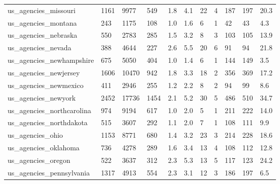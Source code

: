 \begin{longtable}{lllllllllll}
 us\_agencies\_missouri                               & 1161       & 9977      & 549   & 1.8    & 4.1    & 22    & 4      & 187    & 197    & 20.3    \\
 us\_agencies\_montana                                & 243        & 1175      & 108   & 1.0    & 1.6    & 6     & 1      & 42     & 43     & 4.3     \\
 us\_agencies\_nebraska                               & 550        & 2783      & 285   & 1.5    & 3.2    & 8     & 3      & 103    & 105    & 13.9    \\
 us\_agencies\_nevada                                 & 388        & 4644      & 227   & 2.6    & 5.5    & 20    & 6      & 91     & 94     & 21.8    \\
 us\_agencies\_newhampshire                           & 675        & 5050      & 404   & 1.0    & 1.4    & 6     & 1      & 144    & 149    & 3.5     \\
 us\_agencies\_newjersey                              & 1606       & 10470     & 942   & 1.8    & 3.3    & 18    & 2      & 356    & 369    & 17.2    \\
 us\_agencies\_newmexico                              & 411        & 2946      & 255   & 1.2    & 2.2    & 8     & 2      & 94     & 99     & 8.6     \\
 us\_agencies\_newyork                                & 2452       & 17736     & 1454  & 2.1    & 5.2    & 30    & 5      & 486    & 510    & 34.7    \\
 us\_agencies\_northcarolina                          & 974        & 9194      & 617   & 1.0    & 2.0    & 5     & 1      & 211    & 222    & 14.0    \\
 us\_agencies\_northdakota                            & 515        & 3607      & 292   & 1.1    & 2.0    & 7     & 1      & 108    & 111    & 9.9     \\
 us\_agencies\_ohio                                   & 1153       & 8771      & 680   & 1.4    & 3.2    & 23    & 3      & 214    & 228    & 18.6    \\
 us\_agencies\_oklahoma                               & 736        & 4278      & 289   & 1.6    & 3.4    & 13    & 4      & 108    & 112    & 12.8    \\
 us\_agencies\_oregon                                 & 522        & 3637      & 312   & 2.3    & 5.3    & 13    & 5      & 117    & 123    & 24.2    \\
 us\_agencies\_pennsylvania                           & 1317       & 4913      & 554   & 2.3    & 3.1    & 12    & 3      & 186    & 197    & 6.5     \\

\end{longtable}
